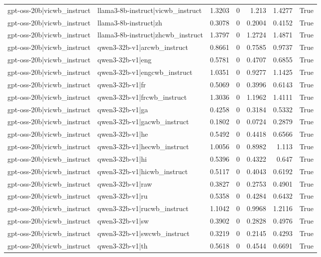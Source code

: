\begin{table}
\begin{tabular}{l l r r r r l}
gpt-oss-20b|vicwb_instruct & llama3-8b-instruct|vicwb_instruct & 1.3203 & 0 & 1.213 & 1.4277 & True \\
gpt-oss-20b|vicwb_instruct & llama3-8b-instruct|zh & 0.3078 & 0 & 0.2004 & 0.4152 & True \\
gpt-oss-20b|vicwb_instruct & llama3-8b-instruct|zhcwb_instruct & 1.3797 & 0 & 1.2724 & 1.4871 & True \\
gpt-oss-20b|vicwb_instruct & qwen3-32b-v1|arcwb_instruct & 0.8661 & 0 & 0.7585 & 0.9737 & True \\
gpt-oss-20b|vicwb_instruct & qwen3-32b-v1|eng & 0.5781 & 0 & 0.4707 & 0.6855 & True \\
gpt-oss-20b|vicwb_instruct & qwen3-32b-v1|engcwb_instruct & 1.0351 & 0 & 0.9277 & 1.1425 & True \\
gpt-oss-20b|vicwb_instruct & qwen3-32b-v1|fr & 0.5069 & 0 & 0.3996 & 0.6143 & True \\
gpt-oss-20b|vicwb_instruct & qwen3-32b-v1|frcwb_instruct & 1.3036 & 0 & 1.1962 & 1.4111 & True \\
gpt-oss-20b|vicwb_instruct & qwen3-32b-v1|ga & 0.4258 & 0 & 0.3184 & 0.5332 & True \\
gpt-oss-20b|vicwb_instruct & qwen3-32b-v1|gacwb_instruct & 0.1802 & 0 & 0.0724 & 0.2879 & True \\
gpt-oss-20b|vicwb_instruct & qwen3-32b-v1|he & 0.5492 & 0 & 0.4418 & 0.6566 & True \\
gpt-oss-20b|vicwb_instruct & qwen3-32b-v1|hecwb_instruct & 1.0056 & 0 & 0.8982 & 1.113 & True \\
gpt-oss-20b|vicwb_instruct & qwen3-32b-v1|hi & 0.5396 & 0 & 0.4322 & 0.647 & True \\
gpt-oss-20b|vicwb_instruct & qwen3-32b-v1|hicwb_instruct & 0.5117 & 0 & 0.4043 & 0.6192 & True \\
gpt-oss-20b|vicwb_instruct & qwen3-32b-v1|raw & 0.3827 & 0 & 0.2753 & 0.4901 & True \\
gpt-oss-20b|vicwb_instruct & qwen3-32b-v1|ru & 0.5358 & 0 & 0.4284 & 0.6432 & True \\
gpt-oss-20b|vicwb_instruct & qwen3-32b-v1|rucwb_instruct & 1.1042 & 0 & 0.9968 & 1.2116 & True \\
gpt-oss-20b|vicwb_instruct & qwen3-32b-v1|sw & 0.3902 & 0 & 0.2828 & 0.4976 & True \\
gpt-oss-20b|vicwb_instruct & qwen3-32b-v1|swcwb_instruct & 0.3219 & 0 & 0.2145 & 0.4293 & True \\
gpt-oss-20b|vicwb_instruct & qwen3-32b-v1|th & 0.5618 & 0 & 0.4544 & 0.6691 & True \\

\end{tabular}
\end{table}
